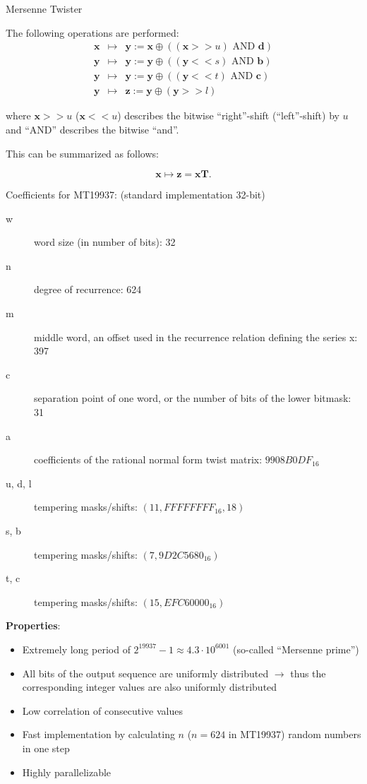 \begin{vbframe}{Mersenne Twister}
\framebreak

The following operations are performed:
\vspace*{-0.2cm}
\begin{eqnarray*}
\mathbf{x} &\mapsto& \mathbf{y} := \mathbf{x} \oplus ((\mathbf{x} >> u) \text{ AND } \mathbf{d}) \\ \mathbf{y} &\mapsto& \mathbf{y} := \mathbf{y} \oplus ((\mathbf{y} << s) \text{ AND } \mathbf{b}) \\
\mathbf{y} &\mapsto& \mathbf{y} := \mathbf{y} \oplus ((\mathbf{y} < < t) \text{ AND } \mathbf{c}) \\ \mathbf{y} &\mapsto& \mathbf{z} := \mathbf{y} \oplus (\mathbf{y} >> l)
\end{eqnarray*}

where $\mathbf{x} >> u$ ($\mathbf{x} << u$) describes the bitwise \enquote{right}-shift (\enquote{left}-shift) by $u$ and \enquote{AND} describes the bitwise \enquote{and}.

\lz

This can be summarized as follows:

$$\mathbf{x} \mapsto \mathbf{z} = \mathbf{x}\mathbf{T}. $$


\framebreak

Coefficients for MT19937: (standard implementation 32-bit)

\begin{description}
  \item[w] word size (in number of bits): 32
  \item[n] degree of recurrence: 624
  \item[m] middle word, an offset used in the recurrence relation defining the series x: 397
  \item[c] separation point of one word, or the number of bits of the lower bitmask: 31
  \item[a] coefficients of the rational normal form twist matrix: $9908B0DF_{16}$
  \item[u, d, l] tempering masks/shifts: $(11, FFFFFFFF_{16}, 18)$
  \item[s, b] tempering masks/shifts: $(7, 9D2C5680_{16})$
  \item[t, c] tempering masks/shifts:  $(15, EFC60000_{16})$
\end{description}

\framebreak


\textbf{Properties}:

\begin{itemize}
	\item Extremely long period of $2^{19937} - 1\approx 4.3 \cdot 10^{6001}$ (so-called \enquote{Mersenne prime})
	\item All bits of the output sequence are uniformly distributed $\to$ thus the corresponding integer values are also uniformly distributed
	\item Low correlation of consecutive values
	\item Fast implementation by calculating $n$ ($n = 624$ in MT19937) random numbers in one step
	\item Highly parallelizable
\end{itemize}


\end{vbframe}
